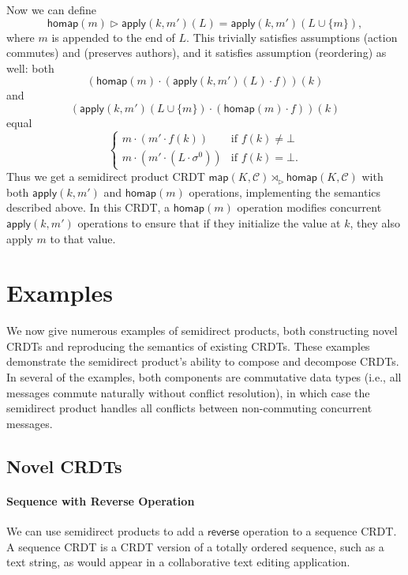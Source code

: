 \documentclass[acmsmall,nonacm,12pt]{acmart}
\newcommand{\mc}[1]{\ensuremath{\mathcal{#1}}}
\newcommand{\msf}[1]{\ensuremath{\mathsf{#1}}}
\newcommand{\act}{\triangleright}
\theoremstyle{plain}
\theoremstyle{definition}
\begin{document}
Now we can define
\[
\msf{homap}(m) \act \msf{apply}(k, m')(L) = \msf{apply}(k, m')(L \cup \{m\}),
\]
where $m$ is appended to the end of $L$.  This trivially satisfies assumptions (action commutes) and (preserves authors), and it satisfies assumption (reordering) as well: both
\[
\left(\msf{homap}(m) \cdot (\msf{apply}(k, m')(L) \cdot f)\right)(k)
\]
and
\[
\left(\msf{apply}(k, m')(L \cup \{m\}) \cdot (\msf{homap}(m) \cdot f)\right)(k)
\]
equal
\[
\begin{cases} m \cdot (m' \cdot f(k)) &\mbox{if $f(k) \neq \bot$} \\ m \cdot (m' \cdot (L \cdot \sigma^0)) &\mbox{if $f(k) = \bot$.} \end{cases}
\]
Thus we get a semidirect product CRDT $\msf{map}(K, \mc{C}) \rtimes_\act \msf{homap}(K, \mc{C})$ with both $\msf{apply}(k, m')$ and $\msf{homap}(m)$ operations, implementing the semantics described above.  In this CRDT, a $\msf{homap}(m)$ operation modifies concurrent $\msf{apply}(k, m')$ operations to ensure that if they initialize the value at $k$, they also apply $m$ to that value.




\section{Examples}
\label{sec:examples}
We now give numerous examples of semidirect products, both constructing novel CRDTs and reproducing the semantics of existing CRDTs.  These examples demonstrate the semidirect product's ability to compose and decompose CRDTs.  In several of the examples, both components are commutative data types (i.e., all messages commute naturally without conflict resolution), in which case the semidirect product handles all conflicts between non-commuting concurrent messages.





\subsection{Novel CRDTs}
\paragraph{Sequence with Reverse Operation}
We can use semidirect products to add a $\msf{reverse}$ operation to a sequence CRDT.  A sequence CRDT is a CRDT version of a totally ordered sequence, such as a text string, as would appear in a collaborative text editing application.
\end{document}

